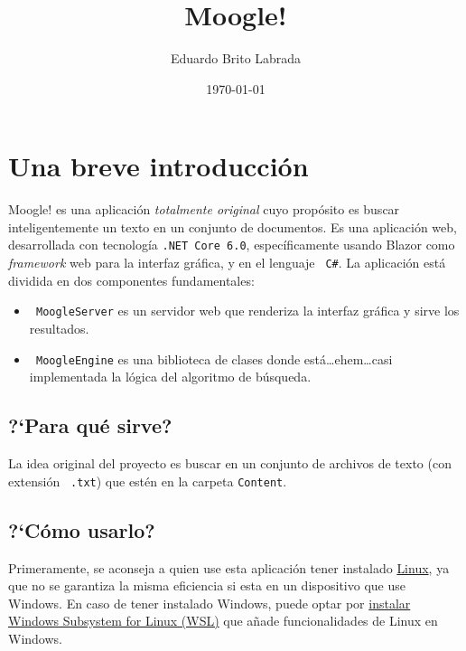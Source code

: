 \documentclass{report}
\begin{document}
\title{\bf \LARGE Moogle!}
\author{Eduardo Brito Labrada}
\date{\today}

\maketitle

\section*{Una breve introducci\'on}

Moogle! es una aplicación {\it totalmente original} cuyo propósito es buscar inteligentemente un texto en un conjunto de documentos. Es una aplicación web, desarrollada con tecnología {\tt \color{gray45}.NET Core 6.0}, específicamente usando Blazor como {\it framework} web para la interfaz gráfica, y en el lenguaje {\tt \color{gray45} C\#}.
La aplicación está dividida en dos componentes fundamentales:

\begin{itemize}
	\item {\tt \color{gray45} MoogleServer} es un servidor web que renderiza la interfaz gráfica y sirve los resultados.
	\item {\tt \color{gray45} MoogleEngine} es una biblioteca de clases donde está\dots ehem\dots casi implementada la lógica del algoritmo de búsqueda.
\end{itemize}

\subsection*{?`Para qu\'e sirve?}

La idea original del proyecto es buscar en un conjunto de archivos de texto (con extensión {\tt \color{gray45} .txt}) que estén en la carpeta {\tt \color{gray45}Content}.

\subsection*{?`C\'omo usarlo?}

Primeramente, se aconseja a quien use esta aplicaci\'on tener instalado \href{https://es.wikipedia.org/wiki/Linux}{Linux}, ya que no se garantiza la misma eficiencia si esta en un dispositivo que use Windows.
En caso de tener instalado Windows, puede optar por \href{https://learn.microsoft.com/es-es/windows/wsl/install}{instalar Windows Subsystem for Linux (WSL)} que a\~nade
funcionalidades de Linux en Windows.
\end{document}
